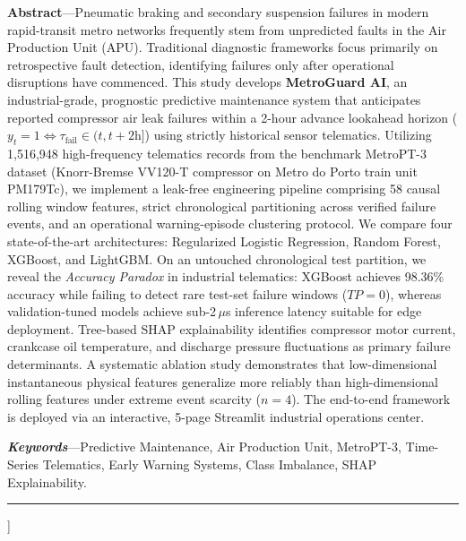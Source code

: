 \documentclass[10pt,twocolumn,a4paper]{article}
\begin{document}
{\begin{center}
    \begin{minipage}{0.92\textwidth}
      \small
      \textbf{Abstract}---Pneumatic braking and secondary suspension failures in modern rapid-transit metro networks frequently stem from unpredicted faults in the Air Production Unit (APU). Traditional diagnostic frameworks focus primarily on retrospective fault detection, identifying failures only after operational disruptions have commenced. This study develops \textbf{MetroGuard AI}, an industrial-grade, prognostic predictive maintenance system that anticipates reported compressor air leak failures within a 2-hour advance lookahead horizon ($y_t = 1 \iff \tau_{\text{fail}} \in (t, t+2\text{h}]$) using strictly historical sensor telematics. Utilizing 1,516,948 high-frequency telematics records from the benchmark MetroPT-3 dataset (Knorr-Bremse VV120-T compressor on Metro do Porto train unit PM179Tc), we implement a leak-free engineering pipeline comprising 58 causal rolling window features, strict chronological partitioning across verified failure events, and an operational warning-episode clustering protocol. We compare four state-of-the-art architectures: Regularized Logistic Regression, Random Forest, XGBoost, and LightGBM. On an untouched chronological test partition, we reveal the \textit{Accuracy Paradox} in industrial telematics: XGBoost achieves 98.36\% accuracy while failing to detect rare test-set failure windows ($TP = 0$), whereas validation-tuned models achieve sub-2\,$\mu$s inference latency suitable for edge deployment. Tree-based SHAP explainability identifies compressor motor current, crankcase oil temperature, and discharge pressure fluctuations as primary failure determinants. A systematic ablation study demonstrates that low-dimensional instantaneous physical features generalize more reliably than high-dimensional rolling features under extreme event scarcity ($n=4$). The end-to-end framework is deployed via an interactive, 5-page Streamlit industrial operations center.
      \par\vspace{0.25cm}
      \textbf{\textit{Keywords}}---Predictive Maintenance, Air Production Unit, MetroPT-3, Time-Series Telematics, Early Warning Systems, Class Imbalance, SHAP Explainability.
    \end{minipage}
    \par\vspace{0.35cm}
    \hrule
    \par\vspace{0.5cm}
  \end{center}
}]
\end{document}
